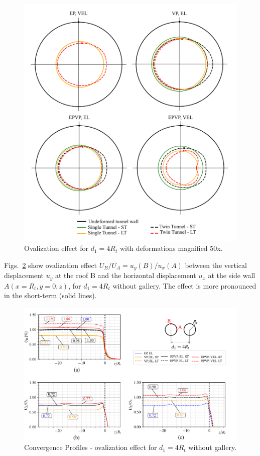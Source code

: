 \documentclass[a4paper,fleqn]{cas-sc}
\begin{document}
\begin{figure}[h!]
	\centering
	\includegraphics[scale=0.4]{ovalization.pdf}
	\caption{Ovalization effect for $d_1 = 4R_t$ with deformations magnified 50x.}
	\label{ovalization}
\end{figure}
\FloatBarrier
Figs.~\ref{UB-UAUB-D1_4RT} show ovalization effect $U_B/U_A = u_y(B)/u_x(A)$ between the vertical displacement $u_y$ at the roof B and the horizontal displacement $u_x$ at the side wall $A(x=R_t,y=0,z)$, for $d_1 = 4R_t$ without gallery. The effect is more pronounced in the short-term (solid lines).
\begin{figure}[h!]
	\centering
	\includegraphics[scale=0.65]{Convergence Profiles - UB - UAUB - $d_1=4R_t - ST_Lt$.pdf}
	\caption{Convergence Profiles - ovalization effect for $d_1 = 4R_t$ without gallery.}
	\label{UB-UAUB-D1_4RT}
\end{figure}
\FloatBarrier
\end{document}
